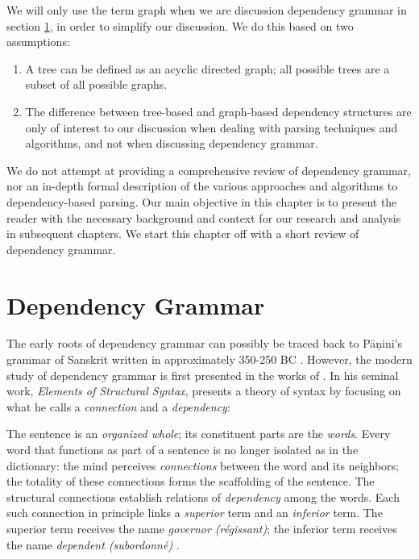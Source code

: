 We will only use the term graph when we are discussion dependency grammar in section \ref{grammar}, in order to simplify our discussion. We do this based on two assumptions:

\begin{enumerate}
\item A tree can be defined as an acyclic directed graph; all possible trees are a subset of all possible graphs.
\item The difference between tree-based and graph-based dependency structures are only of interest to our discussion when dealing with parsing techniques and algorithms, and not when discussing dependency grammar.
\end{enumerate}

We do not attempt at providing a comprehensive review of dependency grammar, nor an in-depth formal description of the various approaches and algorithms to dependency-based parsing. Our main objective in this chapter is to present the reader with the necessary background and context for our research and analysis in subsequent chapters. We start this chapter off with a short review of dependency grammar.

\section{Dependency Grammar}
\label{grammar}

The early roots of dependency grammar can possibly be traced back to P\={a}\d{n}ini's grammar of Sanskrit written in approximately 350-250 BC \cite{Kruijff:02}. However, the modern study of  dependency grammar is first presented in the works of \citeauthor{Tes:15}. In his seminal work, \textit{Elements of Structural Syntax}, \citeauthor{Tes:15} presents a theory of syntax by focusing on what he calls a \textit{connection} and a \textit{dependency}:

\begin{displayquote}
The sentence is an \textit{organized whole}; its constituent parts are the \textit{words}. Every word that functions as part of a sentence is no longer isolated as in the dictionary: the mind perceives \textit{connections} between the word and its neighbors; the totality of these connections forms the scaffolding of the sentence. The structural connections establish relations of \textit{dependency} among the words. Each such connection in principle links a \textit{superior} term and an \textit{inferior} term. The superior term receives the name \textit{governor (r\'{e}gissant)}; the inferior term receives the name \textit{dependent (subordonn\'{e})} \cite{Tes:15}.
\end{displayquote}

